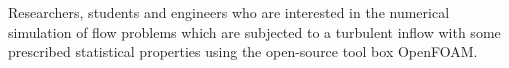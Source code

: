 
Researchers, students and engineers who are interested in the numerical simulation
of flow problems which are subjected to a turbulent inflow with some prescribed
statistical properties using the open-source tool box OpenFOAM.


